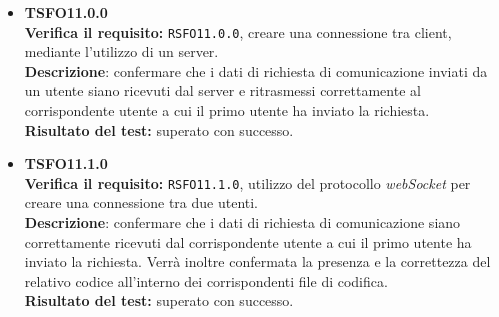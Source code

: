 \begin{itemize}


\item \textbf{TSFO11.0.0}\\
\textbf{Verifica il requisito:} \texttt{RSFO11.0.0}, creare una connessione tra client, mediante l'utilizzo di un server.\\
\textbf{Descrizione}: confermare che i dati di richiesta di comunicazione inviati da un utente  siano ricevuti dal server e ritrasmessi correttamente al corrispondente utente  a cui il primo utente ha inviato la richiesta.\\
\textbf{Risultato del test:} superato con successo.

\item \textbf{TSFO11.1.0}\\
\textbf{Verifica il requisito:} \texttt{RSFO11.1.0}, utilizzo del protocollo \textit{webSocket} per creare una connessione tra due utenti.\\
\textbf{Descrizione}: confermare che i dati di richiesta di comunicazione siano correttamente ricevuti dal corrispondente utente  a cui il primo utente ha inviato la richiesta. Verrà inoltre confermata la presenza e la correttezza  del relativo codice all'interno dei corrispondenti file di codifica.\\
\textbf{Risultato del test:} superato con successo.


\end{itemize}
